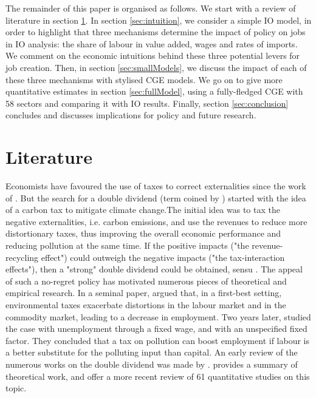 The remainder of this paper is organised as follows.
We start with a review of literature in section \ref{sec:literature}. In section \ref{sec:intuition}, we consider a simple IO model, in order to highlight that three mechanisms determine the impact of policy on jobs in IO analysis: the share of labour in value added, wages and rates of imports. We comment on the economic intuitions behind these three potential levers for job creation.
Then, in section  \ref{sec:smallModels}, we discuss the impact of each of these three mechanisms with stylised CGE models.
We go on to give more quantitative estimates in section \ref{sec:fullModel}, using a fully-fledged CGE with 58 sectors and comparing it with IO results.
Finally, section \ref{sec:conclusion} concludes and discusses implications for policy and future research.



\section{Literature} \label{sec:literature}

Economists have favoured the use of taxes to correct externalities since the work of \citet{Pigou1920}.
But the search for a double dividend (term coined by \citet{Pearce1991}) started with the idea of a carbon tax to mitigate climate change.The initial idea was to tax the negative externalities, i.e. carbon emissions, and use the revenues to reduce more distortionary taxes, thus improving the overall economic performance and reducing pollution at the same time. If the positive impacts ("the revenue-recycling effect") could outweigh the negative impacts ("the tax-interaction effects"), then a "strong" double dividend could be obtained, sensu \citet{Goulder1994}.
The appeal of such a no-regret policy has motivated numerous pieces of theoretical and empirical research. 
In a seminal paper, \citet{Bovenberg1994a} argued that, in a first-best setting, environmental taxes exacerbate distortions in the labour market and in the commodity market, leading to a decrease in employment.
Two years later, \citet{Bovenberg1996} studied the case with unemployment through a fixed wage, and with an unspecified fixed factor. They concluded that a tax on pollution can boost employment if labour is a better substitute for the polluting input than capital. 
An early review of the numerous works on the double dividend was made by \citet{Goulder1994}. \citet{Chiroleu-Assouline2001} provides a summary of theoretical work, and \citet{Patuelli2005} offer a more recent review of 61 quantitative studies on this topic.


